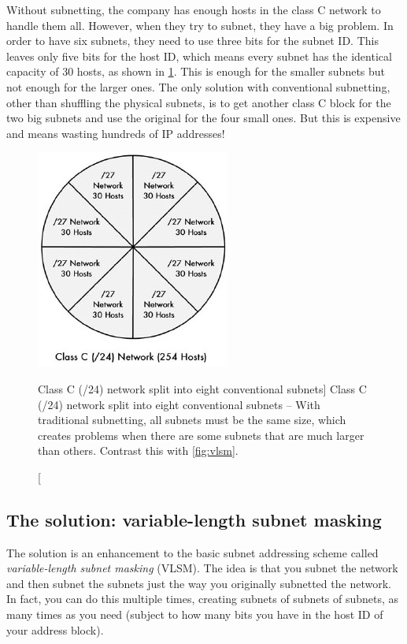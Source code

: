 Without subnetting, the company has enough hosts in the class C network
to handle them all. However, when they try to subnet, they have a big
problem. In order to have six subnets, they need to use three bits for
the subnet ID. This leaves only five bits for the host ID, which means
every subnet has the identical capacity of 30 hosts, as shown in
\cref{fig:conventional-subnetting}.
This is enough for the smaller subnets but not enough for the larger
ones. The only solution with conventional subnetting, other than
shuffling the physical subnets, is to get another class C block for the
two big subnets and use the original for the four small ones. But this
is expensive and means wasting hundreds of IP addresses!


\begin{figure}
   \centering
   \includegraphics[width=.4\textwidth]{images/conventional-subnetting.jpg}
   \caption
      [Class C (/24) network split into eight conventional subnets]
      {Class C (/24) network split into eight conventional subnets --
      With traditional subnetting, all subnets must be the same size, which creates problems when there are some subnets that are much larger than others.
      Contrast this with \vref{fig:vlsm}.}
   \label{fig:conventional-subnetting}
\end{figure}



\subsection{The solution: variable-length subnet masking}

The solution is an enhancement to the basic subnet addressing scheme called \emph{variable-length subnet masking} (VLSM).
The idea is that you subnet the network and then subnet the subnets just the way you originally subnetted the network.
In fact, you can do this multiple times, creating subnets of subnets of subnets, as many times as you need
(subject to how many bits you have in the host ID of your address block).

